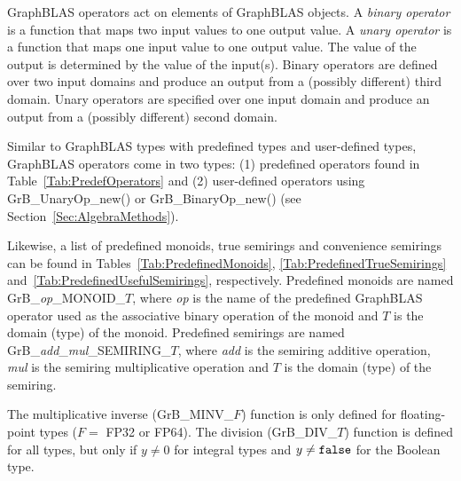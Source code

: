 GraphBLAS operators act on elements of GraphBLAS objects. A \emph{binary
operator} is a function that maps two input values to one output value. A
\emph{unary operator} is a function that maps one input value to one
output value. The value of the output is determined by the value of
the input(s).  Binary operators are defined over two input domains
and produce an output from a (possibly different) third domain. Unary
operators are specified over one input domain and produce an output from a
(possibly different) second domain.

Similar to GraphBLAS types with predefined types and user-defined types,
GraphBLAS operators come in two types: (1) predefined operators found
in Table~\ref{Tab:PredefOperators} and (2) user-defined operators
using {\sf GrB\_UnaryOp\_new()} or {\sf GrB\_BinaryOp\_new()} (see
Section~\ref{Sec:AlgebraMethods}).

Likewise, a list of predefined monoids, true semirings and convenience
semirings can be found in Tables~\ref{Tab:PredefinedMonoids},
\ref{Tab:PredefinedTrueSemirings} and~\ref{Tab:PredefinedUsefulSemirings},
respectively.  Predefined monoids are named {\sf
GrB\_\emph{op}\_MONOID\_$T$}, where \emph{op} is the name of the
predefined GraphBLAS operator used as the associative binary operation
of the monoid and $T$ is the domain (type) of the monoid.  Predefined
semirings are named {\sf GrB\_\emph{add}\_\emph{mul}\_SEMIRING\_$T$},
where \emph{add} is the semiring additive operation, \emph{mul} is
the semiring multiplicative operation and $T$ is the domain (type)
of the semiring.

The multiplicative inverse ({\sf GrB\_MINV\_$F$}) function is only defined
for floating-point types ($F = $ {\sf FP32} or {\sf FP64}).  The division
({\sf GrB\_DIV\_$T$}) function is defined for all types, but only if $y
\neq 0$ for integral types and $y \neq {\tt false}$ for the Boolean type.


